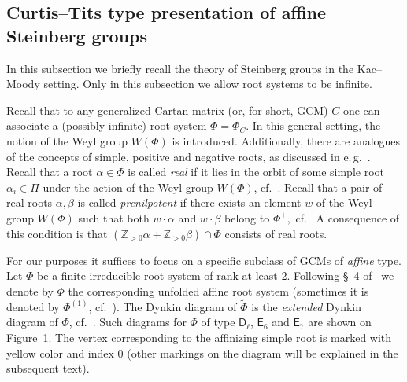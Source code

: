 \documentclass[oneside, 10pt]{amsart}
\newcommand{\rD}{\mathsf{D}}
\newcommand{\rE}{\mathsf{E}}
\numberwithin{equation}{section}
\numberwithin{thm}{section}
\numberwithin{lemma}{section}
\theoremstyle{definition}
\theoremstyle{remark}
\begin{document}
\subsection{Curtis--Tits type presentation of affine Steinberg groups} \label{subsec:curtis-tits}
In this subsection we briefly recall the theory of Steinberg groups in the Kac--Moody setting.
Only in this subsection we allow root systems to be infinite.

Recall that to any generalized Cartan matrix (or, for short, GCM) $C$ one can associate a (possibly infinite) root system $\Phi = \Phi_C$.
In this general setting, the notion of the Weyl group $W(\Phi)$ is introduced.
Additionally, there are analogues of the concepts of simple, positive and negative roots, as discussed in e.\,g.~\cite[\S~16]{Ca05}.
Recall that a root $\alpha \in \Phi$ is called \textit{real} if it lies in the orbit of some simple root $\alpha_i \in \Pi$ under the action of the Weyl group $W(\Phi)$, cf.~\cite[\S~16.3]{Ca05}.
Recall that a pair of real roots $\alpha, \beta$ is called \textit{prenilpotent} if there exists an element $w$ of the Weyl group $W(\Phi)$ such that both $w\cdot \alpha$ and $w \cdot \beta$ belong to $\Phi^+,$ cf.~\cite[\S~3]{A16}
A consequence of this condition is that $(\mathbb{Z}_{>0} \alpha + \mathbb{Z}_{>0}\beta)\cap \Phi$ consists of real roots.

For our purposes it suffices to focus on a specific subclass of GCMs of \textit{affine} type.
Let $\Phi$ be a finite irreducible root system of rank at least $2$.
Following \S~4 of~\cite{A16} we denote by $\widetilde{\Phi}$ the corresponding unfolded affine root system (sometimes it is denoted by $\Phi^{(1)}$, cf.~\cite[Table~2]{A16}).
The Dynkin diagram of $\widetilde{\Phi}$ is the \textit{extended} Dynkin diagram of $\Phi$, cf.~\cite[\S~17.1]{Ca05}.
Such diagrams for $\Phi$ of type $\rD_\ell$, $\rE_6$ and $\rE_7$ are shown on Figure~1.
The vertex corresponding to the affinizing simple root is marked with yellow color and index $0$ (other markings on the diagram will be explained in the subsequent text).
\end{document}
